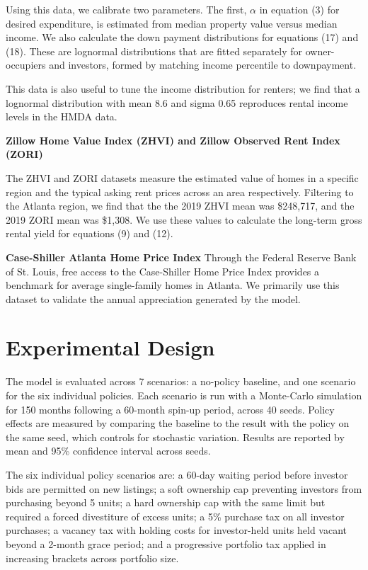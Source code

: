 \documentclass[twocolumn,showpacs,%
  nofootinbib,aps,superscriptaddress,%
  eqsecnum,prd,notitlepage,showkeys,10pt]{revtex4-1}
\begin{document}
Using this data, we calibrate two parameters. The first, $\alpha$ in equation (3) for desired expenditure, is estimated from median property value versus median income. We also calculate the down payment distributions for equations (17) and (18). These are lognormal distributions that are fitted separately for owner-occupiers and investors, formed by matching income percentile to downpayment. \newline 

This data is also useful to tune the income distribution for renters; we find that a lognormal distribution with mean 8.6 and sigma 0.65 reproduces rental income levels in the HMDA data. \newline

\textbf{Zillow Home Value Index (ZHVI) and Zillow Observed Rent Index (ZORI)}

The ZHVI and ZORI datasets measure the estimated value of homes in a specific region and the typical asking rent prices across an area respectively. Filtering to the Atlanta region, we find that the the 2019 ZHVI mean was \$248,717, and the 2019 ZORI mean was \$1,308. We use these values to calculate the long-term gross rental yield for equations (9) and (12). \newline

\textbf{Case-Shiller Atlanta Home Price Index}
Through the Federal Reserve Bank of St. Louis, free access to the Case-Shiller Home Price Index provides a benchmark for average single-family homes in Atlanta. We primarily use this dataset to validate the annual appreciation generated by the model. 



\section{Experimental Design}

The model is evaluated across 7 scenarios: a no-policy baseline, and one scenario for the six individual policies. Each scenario is run with a Monte-Carlo simulation for 150 months following a 60-month spin-up period, across 40 seeds. Policy effects are measured by comparing the baseline to the result with the policy on the same seed, which controls for stochastic variation. Results are reported by mean and 95\% confidence interval across seeds. \newline

The six individual policy scenarios are: a 60-day waiting period before investor bids are permitted on new listings; a soft ownership cap preventing investors from purchasing beyond 5 units; a hard ownership cap with the same limit but required a forced divestiture of excess units; a 5\% purchase tax on all investor purchases; a vacancy tax with holding costs for investor-held units held vacant beyond a 2-month grace period; and a progressive portfolio tax applied in increasing brackets across portfolio size. \newline
\end{document}
